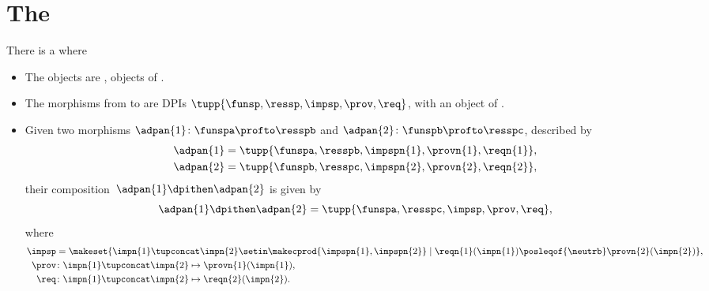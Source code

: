 \section{The  \DPI}
\label{sec:DPI-semicat}


\begin{definition}
    \label{def:DPIcat}
    There is a  \DPI where
    \begin{itemize}
        \item The objects are , objects of \PosL.
        \item The morphisms from \funsp to \ressp are DPIs $\tupp{\funsp,\ressp,\impsp,\prov,\req}$, with \impsp an object of \SetL.
        \item\label{def:dpi-series}  Given two morphisms 
                  $\adpan{1} \colon \funspa \profto \resspb$ and 
                  $\adpan{2} \colon \funspb \profto \resspc$,
              described by
              \begin{align}
                  \adpan{1} & = \tupp{\funspa,\resspb,\impspn{1},\provn{1},\reqn{1}}, \\
                  \adpan{2} & = \tupp{\funspb,\resspc,\impspn{2},\provn{2},\reqn{2}},
              \end{align}
              their composition~$\adpan{1} \dpithen \adpan{2}$ is given by
              \begin{equation}
                  \adpan{1} \dpithen \adpan{2} = \tupp{\funspa,\resspc,\impsp,\prov,\req},
              \end{equation}
              where
              \begin{align}
                  \impsp & = \makeset{ \impn{1} \tupconcat \impn{2} \setin \makecprod{\impspn{1}, \impspn{2}} \mid \reqn{1}(\impn{1}) \posleqof{\neutrb} \provn{2}(\impn{2})}, \\
                  \prov  & \colon \impn{1} \tupconcat \impn{2} \mapsto \provn{1}(\impn{1}), \\
                  \req   & \colon \impn{1} \tupconcat \impn{2} \mapsto \reqn{2}(\impn{2}).
              \end{align}
    \end{itemize}
\end{definition}


